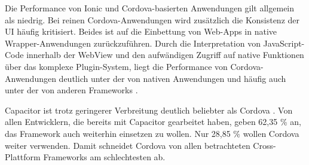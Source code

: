 Die Performance von Ionic und Cordova-basierten Anwendungen gilt allgemein als niedrig.
Bei reinen Cordova-Anwendungen wird zusätzlich die Konsistenz der \ac{UI} häufig kritisiert.
Beides ist auf die Einbettung von Web-Apps in native Wrapper-Anwendungen zurückzuführen.
Durch die Interpretation von JavaScript-Code innerhalb der WebView und den aufwändigen Zugriff auf native Funktionen über das komplexe Plugin-System, liegt die Performance von Cordova-Anwendungen deutlich unter der von nativen Anwendungen und häufig auch unter der von anderen Frameworks \cite{Rieger_CrossPlatform_EvaluationFramework,Manchanda_CrossPlatformFrameworks,Heitkoetter_CrossPlatform_Comparison,Biorn-Hansen_PerformanceOverhead_CrossPlatform}.


Capacitor ist trotz geringerer Verbreitung deutlich beliebter als Cordova \cite{Stackoverflow_2022,Appfigures_TopSDKs}.
Von allen Entwicklern, die bereits mit Capacitor gearbeitet haben, geben 62,35 \% an, das Framework auch weiterhin einsetzen zu wollen.
Nur 28,85 \% wollen Cordova weiter verwenden.
Damit schneidet Cordova von allen betrachteten Cross-Plattform Frameworks am schlechtesten ab.
